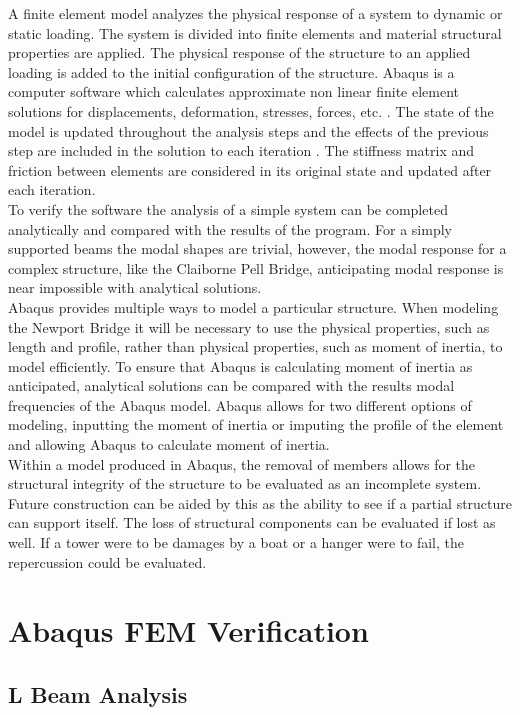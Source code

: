 A finite element model analyzes the physical response of a system to dynamic or static loading. The system is divided into finite elements and material structural properties are applied. The physical response of the structure to an applied loading is added to the initial configuration of the structure. Abaqus is a computer software which calculates approximate non linear finite element solutions for displacements, deformation, stresses, forces, etc. . The state of the model is updated throughout the analysis steps and the effects of the previous step are included in the solution to each iteration \cite{Abaqus}. The stiffness matrix and friction between elements are considered in its original state and updated after each iteration. \cite{Manoj}\\
\indent To verify the software the analysis of a simple system can be completed analytically and compared with the results of the program. For a simply supported beams the modal shapes are trivial, however, the modal response for a complex structure, like the Claiborne Pell Bridge, anticipating modal response is near impossible with analytical solutions. \\
\indent Abaqus provides multiple ways to model a particular structure. When modeling the Newport Bridge it will be necessary to use the physical properties, such as length and profile, rather than physical properties, such as moment of inertia, to model efficiently. To ensure that Abaqus is calculating moment of inertia as anticipated, analytical solutions can be compared with the results modal frequencies of the Abaqus model. Abaqus allows for two different options of modeling, inputting the moment of inertia or imputing the profile of the element and allowing Abaqus to calculate moment of inertia. \\
\indent Within a model produced in Abaqus, the removal of members allows for the structural integrity of the structure to be evaluated as an incomplete system. Future construction can be aided by this as the ability to see if a partial structure can support itself. The loss of structural components can be evaluated if lost as well. If a tower were to be damages by a boat or a hanger were to fail, the repercussion could be evaluated. 

\section{Abaqus FEM Verification}

\subsection{L Beam Analysis}

